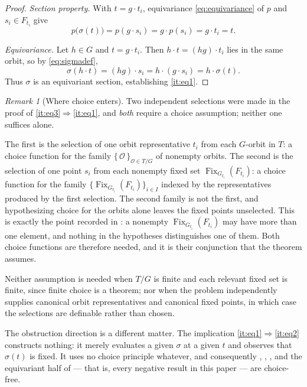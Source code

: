 \documentclass[11pt,reqno]{amsart}
\theoremstyle{plain}
\theoremstyle{definition}
\theoremstyle{remark}
\newtheorem{remark}[theorem]{Remark}
\DeclareMathOperator{\Fix}{Fix}
\begin{document}
\begin{proof}
\emph{Section property.} With $t=g\cdot t_{i}$, equivariance \eqref{eq:equivariance} of $p$ and $s_{i}\in F_{t_{i}}$ give
\[
p\bigl(\sigma(t)\bigr)
=p(g\cdot s_{i})
=g\cdot p(s_{i})
=g\cdot t_{i}
=t .
\]

\emph{Equivariance.} Let $h\in G$ and $t=g\cdot t_{i}$. Then $h\cdot t=(hg)\cdot t_{i}$ lies in the same orbit, so by \eqref{eq:sigmadef},
\[
\sigma(h\cdot t)=(hg)\cdot s_{i}=h\cdot(g\cdot s_{i})=h\cdot\sigma(t).
\]
Thus $\sigma$ is an equivariant section, establishing \ref{it:eq1}.
\end{proof}

\begin{remark}[Where choice enters]
\label{rem:choice}
Two independent selections were made in the proof of \ref{it:eq3}$\Rightarrow$\ref{it:eq1}, and \emph{both} require a choice assumption; neither one suffices alone.

The first is the selection of one orbit representative $t_{i}$ from each $G$-orbit in $T$: a choice function for the family $\{\,\mathcal{O}\,\}_{\mathcal{O}\in T/G}$ of nonempty orbits. The second is the selection of one point $s_{i}$ from each nonempty fixed set $\Fix_{G_{t_{i}}}(F_{t_{i}})$: a choice function for the family $\{\Fix_{G_{t_{i}}}(F_{t_{i}})\}_{i\in I}$ indexed by the representatives produced by the first selection. The second family is not the first, and hypothesizing choice for the orbits alone leaves the fixed points unselected. This is exactly the point recorded in : a nonempty $\Fix_{G_{t_{i}}}(F_{t_{i}})$ may have more than one element, and nothing in the hypotheses distinguishes one of them. Both choice functions are therefore needed, and it is their conjunction that the theorem assumes.

Neither assumption is needed when $T/G$ is finite and each relevant fixed set is finite, since finite choice is a theorem; nor when the problem independently supplies canonical orbit representatives and canonical fixed points, in which case the selections are definable rather than chosen.

The obstruction direction is a different matter. The implication \ref{it:eq1}$\Rightarrow$\ref{it:eq2} constructs nothing: it merely evaluates a given $\sigma$ at a given $t$ and observes that $\sigma(t)$ is fixed. It uses no choice principle whatever, and consequently , , , and the equivariant half of  --- that is, every negative result in this paper --- are choice-free.
\end{remark}
\end{document}
